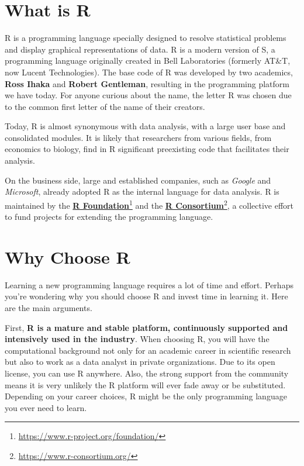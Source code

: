 \documentclass[
  12pt,
]{book}
\begin{document}
\hypertarget{what-is-r}{%
\section{What is R}\label{what-is-r}}

R is a programming language specially designed to resolve statistical problems and display graphical representations of data. R is a modern version of S, a programming language originally created in Bell Laboratories (formerly AT\&T, now Lucent Technologies). The base code of R was developed by two academics, \textbf{Ross Ihaka} and \textbf{Robert Gentleman}, resulting in the programming platform we have today. For anyone curious about the name, the letter R was chosen due to the common first letter of the name of their creators.  

Today, R is almost synonymous with data analysis, with a large user base and consolidated modules. It is likely that researchers from various fields, from economics to biology, find in R significant preexisting code that facilitates their analysis.

On the business side, large and established companies, such as \emph{Google} and \emph{Microsoft}, already adopted R as the internal language for data analysis. R is maintained by the \href{https://www.r-project.org/foundation/}{\textbf{R Foundation}}\footnote{\url{https://www.r-project.org/foundation/}} and the \href{https://www.r-consortium.org/}{\textbf{R Consortium}}\footnote{\url{https://www.r-consortium.org/}}, a collective effort to fund projects for extending the programming language.  

\hypertarget{why-choose-r}{%
\section{Why Choose R}\label{why-choose-r}}

Learning a new programming language requires a lot of time and effort. Perhaps you're wondering why you should choose R and invest time in learning it. Here are the main arguments.

First, \textbf{R is a mature and stable platform, continuously supported and intensively used in the industry}. When choosing R, you will have the computational background not only for an academic career in scientific research but also to work as a data analyst in private organizations. Due to its open license, you can use R anywhere. Also, the strong support from the community means it is very unlikely the R platform will ever fade away or be substituted. Depending on your career choices, R might be the only programming language you ever need to learn.
\end{document}
